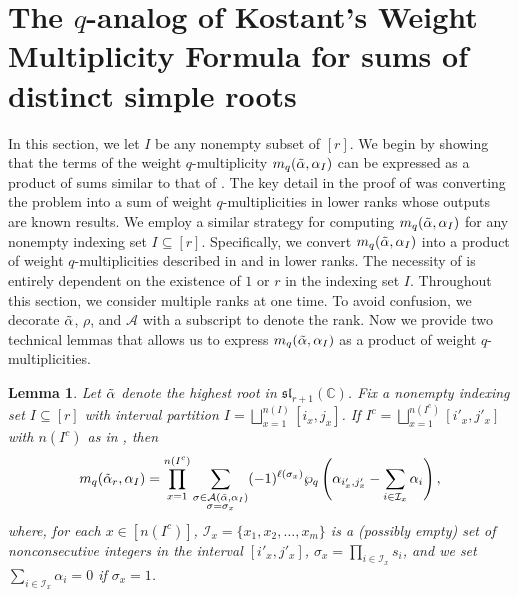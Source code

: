 \documentclass[10pt]{article}
\newtheorem{lemma}[theorem]{Lemma}
\newcommand{\speclin}[0]{\mathfrak{sl}_{r+1}(\mathbb{C})}
\newcommand{\hr}[0]{\Tilde{\alpha}}
\newcommand{\qpartition}[1]{\wp_q\left(#1\right)}
\begin{document}
\section{The $q$-analog of Kostant's Weight Multiplicity Formula for sums of distinct simple roots }\label{section: 4 main results}
In this section, we let $I$ be any nonempty subset of $[r]$. We begin by showing that the terms of the weight $q$-multiplicity $m_q(\hr,\alpha_I)$ can be expressed as a product of sums similar to that of . 
The key detail in the proof of  was converting the problem into a sum of weight $q$-multiplicities in lower ranks whose outputs are known results.  We employ a similar strategy for computing $m_q(\hr,\alpha_I)$ for any nonempty indexing set $I\subseteq [r]$.  
Specifically, we convert $m_q(\hr,\alpha_I)$ into a product of weight $q$-multiplicities  described in  and  in lower ranks. The necessity of  is entirely dependent on the existence of $1$ or $r$ in the indexing set $I$. 
Throughout this section, we consider multiple ranks at one time. To avoid confusion, we decorate $\hr$, $\rho$, and $\mathcal{A}$ with a subscript to denote the rank.
Now we provide two technical lemmas that allows us to express $m_q(\hr,\alpha_I)$ as a product of weight $q$-multiplicities.
\begin{lemma}\label{lemma: mu a sum of positive roots turns KWMF into a product}
    Let $\hr$ denote the highest root in $\speclin$. Fix a nonempty indexing set $I\subseteq [r]$ with interval partition $I=\bigsqcup_{x=1}^{n(I)}[i_x,j_x]$. If $I^c=  
    \bigsqcup_{x=1}^{n(I^c)}[i'_x,j'_x]$ with $n(I^c)$ as in , then 
    \begin{equation}\label{eq:KWMF into a product}
        m_q(\hr_r,\alpha_I)=\prod_{x=1}^{n(I^c)}\sum_{\substack{\sigma\in\mathcal{A}(\hr,\alpha_I) \\ \sigma=\sigma_x}}(-1)^{\ell(\sigma_x)}\qpartition{\alpha_{i'_x,j'_x}-\sum_{i\in\mathcal{I}_x}\alpha_i},
    \end{equation}
    where, for each $x\in [n(I^c)]$, $\mathcal{I}_x=\{x_1,x_2,\ldots,x_m\}$ is a (possibly empty) set of nonconsecutive integers in the interval $[i'_x,j'_x]$, $\sigma_x=\prod_{i\in \mathcal{I}_x}s_i$, and we set $\sum_{i\in\mathcal{I}_x}\alpha_i=0$ if $\sigma_x=1$.  
\end{lemma}
\end{document}
